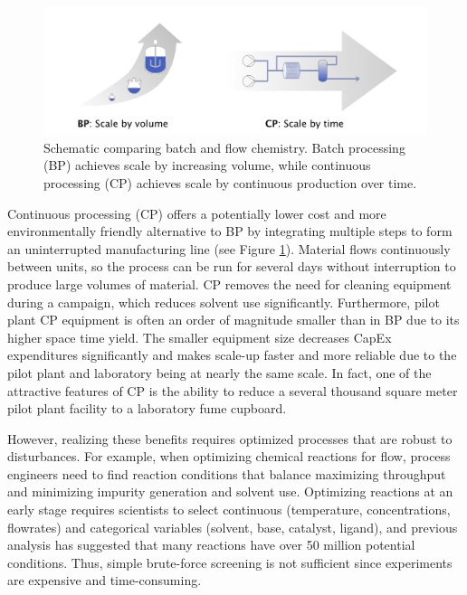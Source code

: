 \begin{figure}[bt]
  \includegraphics[height=0.2\textheight]{gfx/Chapter01/scale_up_schematic.png}
  \caption{Schematic comparing batch and flow chemistry. Batch processing (BP) achieves scale by increasing volume, while continuous processing (CP) achieves scale by continuous production over time.}
  \label{batch_v_flow}
\end{figure}

Continuous processing (CP) offers a potentially lower cost and more environmentally friendly alternative to BP by integrating multiple steps to form an uninterrupted manufacturing line (see Figure \ref{batch_v_flow}). Material flows continuously between units, so the process can be run for several days without interruption to produce large volumes of material. CP removes the need for cleaning equipment during a campaign, which reduces solvent use significantly.\cite{Lee2016} Furthermore, pilot plant CP equipment is often an order of magnitude smaller than in BP due to its higher space time yield.\cite{Elvira2013} The smaller equipment size decreases CapEx expenditures significantly\cite{Escriba-Gelonch2019} and makes scale-up faster and more reliable due to the pilot plant and laboratory being at nearly the same scale.\cite{Cole2019, Rogers2019} In fact, one of the attractive features of CP is the ability to reduce a several thousand square meter pilot plant facility to a laboratory fume cupboard.\cite{Cole2017, Cole2019} 


However, realizing these benefits requires optimized processes that are robust to disturbances. For example, when optimizing chemical reactions for flow, process engineers need to find reaction conditions that balance maximizing throughput and minimizing impurity generation and solvent use. Optimizing reactions at an early stage requires scientists to select continuous (temperature, concentrations, flowrates) and categorical variables (solvent, base, catalyst, ligand), and previous analysis has suggested that many reactions have over 50 million potential conditions. Thus, simple brute-force screening is not sufficient since experiments are expensive and time-consuming.


